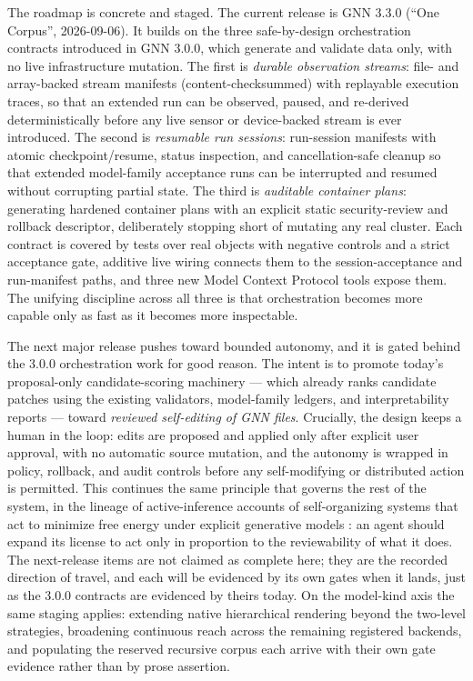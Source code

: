 \documentclass[
  english,
  9pt,
]{extarticle}
\begin{document}
The roadmap is concrete and staged. The current release is GNN 3.3.0
(``One Corpus'', 2026-09-06). It builds on the three safe-by-design
orchestration contracts introduced in GNN 3.0.0, which generate and
validate data only, with no live infrastructure mutation. The first is
\emph{durable observation streams}: file- and array-backed stream
manifests (content-checksummed) with replayable execution traces, so
that an extended run can be observed, paused, and re-derived
deterministically before any live sensor or device-backed stream is ever
introduced. The second is \emph{resumable run sessions}: run-session
manifests with atomic checkpoint/resume, status inspection, and
cancellation-safe cleanup so that extended model-family acceptance runs
can be interrupted and resumed without corrupting partial state. The
third is \emph{auditable container plans}: generating hardened container
plans with an explicit static security-review and rollback descriptor,
deliberately stopping short of mutating any real cluster. Each contract
is covered by tests over real objects with negative controls and a
strict acceptance gate, additive live wiring connects them to the
session-acceptance and run-manifest paths, and three new Model Context
Protocol tools expose them. The unifying discipline across all three is
that orchestration becomes more capable only as fast as it becomes more
inspectable.

The next major release pushes toward bounded autonomy, and it is gated
behind the 3.0.0 orchestration work for good reason. The intent is to
promote today's proposal-only candidate-scoring machinery --- which
already ranks candidate patches using the existing validators,
model-family ledgers, and interpretability reports --- toward
\emph{reviewed self-editing of GNN files}. Crucially, the design keeps a
human in the loop: edits are proposed and applied only after explicit
user approval, with no automatic source mutation, and the autonomy is
wrapped in policy, rollback, and audit controls before any
self-modifying or distributed action is permitted. This continues the
same principle that governs the rest of the system, in the lineage of
active-inference accounts of self-organizing systems that act to
minimize free energy under explicit generative models
\citep{friston2010, parr2022}: an agent should expand its license to act
only in proportion to the reviewability of what it does. The
next-release items are not claimed as complete here; they are the
recorded direction of travel, and each will be evidenced by its own
gates when it lands, just as the 3.0.0 contracts are evidenced by theirs
today. On the model-kind axis the same staging applies: extending native
hierarchical rendering beyond the two-level strategies, broadening
continuous reach across the remaining registered backends, and
populating the reserved recursive corpus each arrive with their own gate
evidence rather than by prose assertion.
\end{document}

